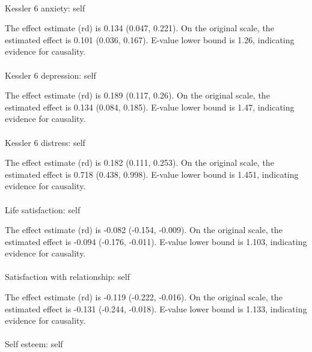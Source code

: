 \documentclass[
  single column]{article}
\makeatletter
\let\oldparagraph\paragraph
\renewcommand{\paragraph}{
    \@ifstar
      \xxxParagraphStar
      \xxxParagraphNoStar
  }
\newcommand{\xxxParagraphStar}[1]{\oldparagraph*{#1}\mbox{}}
\newcommand{\xxxParagraphNoStar}[1]{\oldparagraph{#1}\mbox{}}
\makeatother
\begin{document}
\paragraph{Kessler 6 anxiety: self}\label{kessler-6-anxiety-self-3}

The effect estimate (rd) is 0.134 (0.047, 0.221). On the original scale,
the estimated effect is 0.101 (0.036, 0.167). E-value lower bound is
1.26, indicating evidence for causality.

\paragraph{Kessler 6 depression:
self}\label{kessler-6-depression-self-3}

The effect estimate (rd) is 0.189 (0.117, 0.26). On the original scale,
the estimated effect is 0.134 (0.084, 0.185). E-value lower bound is
1.47, indicating evidence for causality.

\paragraph{Kessler 6 distress: self}\label{kessler-6-distress-self-2}

The effect estimate (rd) is 0.182 (0.111, 0.253). On the original scale,
the estimated effect is 0.718 (0.438, 0.998). E-value lower bound is
1.451, indicating evidence for causality.

\paragraph{Life satisfaction: self}\label{life-satisfaction-self-9}

The effect estimate (rd) is -0.082 (-0.154, -0.009). On the original
scale, the estimated effect is -0.094 (-0.176, -0.011). E-value lower
bound is 1.103, indicating evidence for causality.

\paragraph{Satisfaction with relationship:
self}\label{satisfaction-with-relationship-self-1}

The effect estimate (rd) is -0.119 (-0.222, -0.016). On the original
scale, the estimated effect is -0.131 (-0.244, -0.018). E-value lower
bound is 1.133, indicating evidence for causality.

\paragraph{Self esteem: self}\label{self-esteem-self-5}
\end{document}

